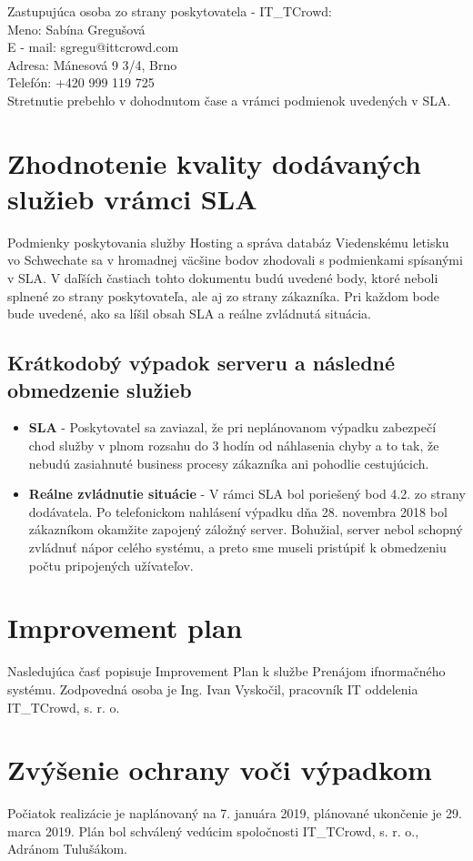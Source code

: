 \documentclass[a4paper, 11pt]{article}
\begin{document}
Zastupujúca osoba zo strany poskytovatela - IT\_TCrowd:\\
Meno: Sabína Gregušová\\
E - mail: sgregu@ittcrowd.com\\
Adresa: Mánesová 9 3/4, Brno\\
Telefón: +420 999 119 725\\

Stretnutie prebehlo v dohodnutom čase a vrámci podmienok uvedených v SLA.

\section*{Zhodnotenie kvality dodávaných služieb vrámci SLA}
Podmienky poskytovania služby Hosting a správa databáz Viedenskému letisku vo Schwechate sa v hromadnej väcšine bodov zhodovali s podmienkami spísanými v SLA. V daľších častiach tohto dokumentu budú uvedené body, ktoré neboli splnené zo strany poskytovateľa, ale aj zo strany zákazníka. Pri každom bode bude uvedené, ako sa líšil obsah SLA a reálne zvládnutá situácia.

\subsection*{Krátkodobý výpadok serveru a následné obmedzenie služieb}
\begin{itemize}
\item \textbf{SLA} - Poskytovatel sa zaviazal, že pri neplánovanom výpadku zabezpečí chod služby v plnom rozsahu do 3 hodín od náhlasenia chyby a to tak, že nebudú zasiahnuté business procesy zákazníka ani pohodlie cestujúcich.
\item \textbf{Reálne zvládnutie situácie} - V rámci SLA bol poriešený bod 4.2. zo strany dodávatela. Po telefonickom nahlásení výpadku dňa 28. novembra 2018 bol zákazníkom okamžite zapojený záložný server. Bohužial, server nebol schopný zvládnuť nápor celého systému, a preto sme museli pristúpiť k obmedzeniu počtu pripojených užívateľov.
\end{itemize}

\section*{Improvement plan}
Nasledujúca časť popisuje Improvement Plan k službe Prenájom ifnormačného systému. Zodpovedná osoba je Ing. Ivan Vyskočil, pracovník IT oddelenia IT\_TCrowd, s. r. o.

\section*{Zvýšenie ochrany voči výpadkom}
Počiatok realizácie je naplánovaný na 7. januára 2019, plánované ukončenie je 29. marca 2019. Plán bol schválený vedúcim spoločnosti IT\_TCrowd, s. r. o., Adránom Tulušákom.
\end{document}
